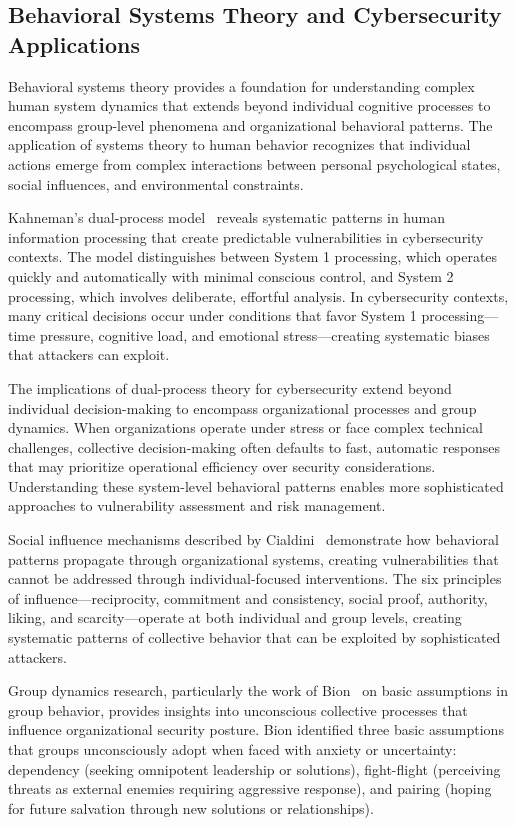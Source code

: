 \documentclass[journal]{IEEEtran}
\begin{document}
\subsection{Behavioral Systems Theory and Cybersecurity Applications}

Behavioral systems theory provides a foundation for understanding complex human system dynamics that extends beyond individual cognitive processes to encompass group-level phenomena and organizational behavioral patterns. The application of systems theory to human behavior recognizes that individual actions emerge from complex interactions between personal psychological states, social influences, and environmental constraints.

Kahneman's dual-process model~\cite{kahneman2011} reveals systematic patterns in human information processing that create predictable vulnerabilities in cybersecurity contexts. The model distinguishes between System 1 processing, which operates quickly and automatically with minimal conscious control, and System 2 processing, which involves deliberate, effortful analysis. In cybersecurity contexts, many critical decisions occur under conditions that favor System 1 processing—time pressure, cognitive load, and emotional stress—creating systematic biases that attackers can exploit.

The implications of dual-process theory for cybersecurity extend beyond individual decision-making to encompass organizational processes and group dynamics. When organizations operate under stress or face complex technical challenges, collective decision-making often defaults to fast, automatic responses that may prioritize operational efficiency over security considerations. Understanding these system-level behavioral patterns enables more sophisticated approaches to vulnerability assessment and risk management.

Social influence mechanisms described by Cialdini~\cite{cialdini2007} demonstrate how behavioral patterns propagate through organizational systems, creating vulnerabilities that cannot be addressed through individual-focused interventions. The six principles of influence—reciprocity, commitment and consistency, social proof, authority, liking, and scarcity—operate at both individual and group levels, creating systematic patterns of collective behavior that can be exploited by sophisticated attackers.

Group dynamics research, particularly the work of Bion~\cite{bion1961} on basic assumptions in group behavior, provides insights into unconscious collective processes that influence organizational security posture. Bion identified three basic assumptions that groups unconsciously adopt when faced with anxiety or uncertainty: dependency (seeking omnipotent leadership or solutions), fight-flight (perceiving threats as external enemies requiring aggressive response), and pairing (hoping for future salvation through new solutions or relationships).
\end{document}
